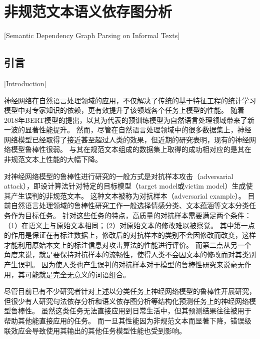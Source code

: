 
\chapter[非规范文本语义依存图分析]{非规范文本语义依存图分析}[Semantic Dependency Graph Parsing on Informal Texts]

\section{引言}[Introduction]
\label{sec:chapter3-intro}

神经网络在自然语言处理领域的应用，不仅解决了传统的基于特征工程的统计学习模型中对专家知识的依赖，更有效提升了该领域各个任务上模型的性能\cite{chen-manning-2014-fast,chiu-nichols-2016-named,ma-hovy-2016-end,zhou-etal-2016-text,chopra-etal-2016-abstractive}。
随着2018年BERT模型的提出，以其为代表的预训练模型为自然语言处理领域带来了新一波的显著性能提升\cite{peters-etal-2018-deep,devlin-etal-2018-bert,yang-etal-2019-xlnet,clark-etal-2020-electra}。
然而，尽管在自然语言处理领域中的很多数据集上，神经网络模型已经取得了接近甚至超过人类的效果，但近期的研究表明，现有的神经网络模型鲁棒性很弱。
与其在规范文本组成的数据集上取得的成功相对应的是其在非规范文本上性能的大幅下降\cite{alzantot-etal-2018-generating, ren-etal-2019-generating, cheng-etal-2019-robust,michel-etal-2019-evaluation, jin-etal-2020-isbert}。

对神经网络模型的鲁棒性进行研究的一般方式是对抗样本攻击（adversarial attack），即设计算法针对特定的目标模型（target model或victim model）生成使其产生误判的非规范文本。
这种文本被称为对抗样本（adversarial example）。
目前自然语言处理领域的鲁棒性研究工作一般选择情感分类、文本蕴涵等文本分类任务作为目标任务。
针对这些任务的特点，高质量的对抗样本需要满足两个条件：（1）在语义上与原始文本相同；（2）对原始文本的修改难以被察觉。
其中第一点的作用是保证在有标注数据上，修改后的对抗样本的类别不会因修改而改变，这样才能利用原始本文上的标注信息对攻击算法的性能进行评价。
而第二点从另一个角度来说，就是要保持对抗样本的流畅性，使得人类不会因文本的修改而对其类别产生误判。
因为使人类也产生误判的对抗样本对于模型的鲁棒性研究来说毫无作用，其可能就是完全无意义的词语组合。

尽管目前已有不少研究者针对上述以分类任务上神经网络模型的鲁棒性开展研究，但很少有人研究句法依存分析和语义依存图分析等结构化预测任务上的神经网络模型鲁棒性。
虽然这类任务无法直接应用到日常生活中，但其预测结果往往被用于帮助其他能直接应用的任务。
而一旦其性能因为非规范文本而显著下降，错误级联效应会导致使用其输出的其他任务模型性能也受到影响。


